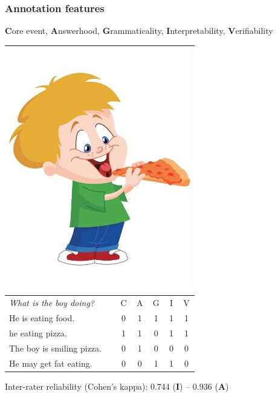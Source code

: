 \documentclass[xcolor={dvipsnames}]{beamer}
\begin{document}
\begin{frame}
\frametitle{Annotation features}
\begin{table}[htb!]
\small
\textbf{C}ore event, \textbf{A}nswerhood, \textbf{G}rammaticality, \textbf{I}nterpretability, \textbf{V}erifiability \\

\vspace{.3em}
\begin{center}
\begin{tabular}{|l|c|c|c|c|c|}
\hline
\multicolumn{6}{|c|}{\includegraphics[width=0.25\columnwidth]{figures/I02.jpg}} \\
\hline
\textit{What is the boy doing?} & C & A & G & I & V \\
\hline
\hline
He is eating food. & 0 & 1 & 1 & 1 & 1 \\
\hline
he eating pizza. & 1 & 1 & 0 & 1 & 1 \\
\hline
The boy is smiling pizza. & 0 & 1 & 0 & 0 & 0 \\
\hline
He may get fat eating. & 0 & 0 & 1 & 1 & 0 \\
\hline
\end{tabular}
\end{center}
\end{table}
\vspace{.3em}

Inter-rater reliability (Cohen's kappa): 0.744 (\textbf{I}) -- 0.936 (\textbf{A}) \\

\end{frame}
\end{document}
